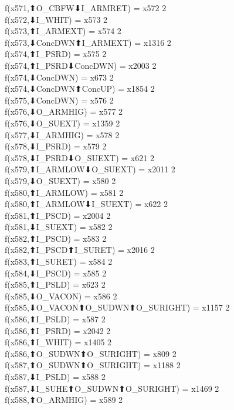 f(x571,⬆O_CBFW⬇I_ARMRET) = x572 {2} \\
f(x572,⬇I_WHIT) = x573 {2} \\
f(x573,⬆I_ARMEXT) = x574 {2} \\
f(x573,⬇ConcDWN⬆I_ARMEXT) = x1316 {2} \\
f(x574,⬆I_PSRD) = x575 {2} \\
f(x574,⬆I_PSRD⬇ConcDWN) = x2003 {2} \\
f(x574,⬇ConcDWN) = x673 {2} \\
f(x574,⬇ConcDWN⬆ConcUP) = x1854 {2} \\
f(x575,⬇ConcDWN) = x576 {2} \\
f(x576,⬇O_ARMHIG) = x577 {2} \\
f(x576,⬇O_SUEXT) = x1359 {2} \\
f(x577,⬇I_ARMHIG) = x578 {2} \\
f(x578,⬇I_PSRD) = x579 {2} \\
f(x578,⬇I_PSRD⬇O_SUEXT) = x621 {2} \\
f(x579,⬆I_ARMLOW⬇O_SUEXT) = x2011 {2} \\
f(x579,⬇O_SUEXT) = x580 {2} \\
f(x580,⬆I_ARMLOW) = x581 {2} \\
f(x580,⬆I_ARMLOW⬇I_SUEXT) = x622 {2} \\
f(x581,⬆I_PSCD) = x2004 {2} \\
f(x581,⬇I_SUEXT) = x582 {2} \\
f(x582,⬆I_PSCD) = x583 {2} \\
f(x582,⬆I_PSCD⬆I_SURET) = x2016 {2} \\
f(x583,⬆I_SURET) = x584 {2} \\
f(x584,⬇I_PSCD) = x585 {2} \\
f(x585,⬆I_PSLD) = x623 {2} \\
f(x585,⬇O_VACON) = x586 {2} \\
f(x585,⬇O_VACON⬆O_SUDWN⬆O_SURIGHT) = x1157 {2} \\
f(x586,⬆I_PSLD) = x587 {2} \\
f(x586,⬆I_PSRD) = x2042 {2} \\
f(x586,⬆I_WHIT) = x1405 {2} \\
f(x586,⬆O_SUDWN⬆O_SURIGHT) = x809 {2} \\
f(x587,⬆O_SUDWN⬆O_SURIGHT) = x1188 {2} \\
f(x587,⬇I_PSLD) = x588 {2} \\
f(x587,⬇I_SUHE⬆O_SUDWN⬆O_SURIGHT) = x1469 {2} \\
f(x588,⬆O_ARMHIG) = x589 {2} \\
